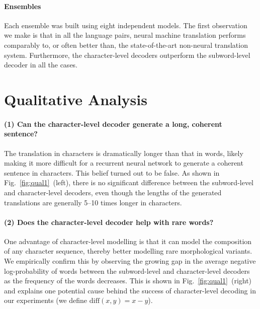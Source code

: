 \documentclass[11pt]{article}
\begin{document}
\paragraph{Ensembles}
Each ensemble was built using eight independent models.
The first observation we make is that in all the language
pairs, neural machine translation performs comparably to, or often better than,
the state-of-the-art non-neural translation system. Furthermore, the
character-level decoders outperform the subword-level decoder in all the cases.

\section{Qualitative Analysis}

\paragraph{(1) Can the character-level decoder generate a long, coherent
sentence?}
The translation in characters is dramatically longer than that in words, likely
making it more difficult for a recurrent neural network to generate a coherent
sentence in characters. This belief turned out to be false.  As shown in
Fig.~\ref{fig:qual1}~(left), there is no significant difference between the
subword-level and character-level decoders, even though the lengths of the
generated translations are generally 5--10 times longer in characters.

\paragraph{(2) Does the character-level decoder help with rare words?}
One advantage of character-level modelling is that it can model the composition
of any character sequence, thereby better modelling rare morphological variants.
We empirically confirm this by observing the growing gap in the average negative
log-probability of words between the subword-level and character-level decoders
as the frequency of the words decreases. This is shown in
Fig.~\ref{fig:qual1}~(right) and explains one potential cause behind the success of
character-level decoding in our experiments (we define $\mathrm{diff}(x, y) = x - y$).
\end{document}

